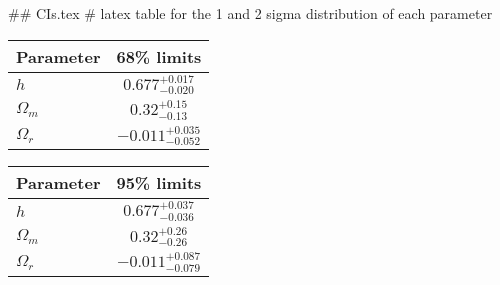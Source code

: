 ## CIs.tex
# latex table for the 1 and 2 sigma distribution of each parameter

\begin{tabular} { l  c}
 Parameter &  68\% limits\\
\hline
{\boldmath$h              $} & $0.677^{+0.017}_{-0.020}   $\\
{\boldmath$\Omega_m       $} & $0.32^{+0.15}_{-0.13}      $\\
{\boldmath$\Omega_r       $} & $-0.011^{+0.035}_{-0.052}  $\\
\hline
\end{tabular}

\begin{tabular} { l  c}
 Parameter &  95\% limits\\
\hline
{\boldmath$h              $} & $0.677^{+0.037}_{-0.036}   $\\
{\boldmath$\Omega_m       $} & $0.32^{+0.26}_{-0.26}      $\\
{\boldmath$\Omega_r       $} & $-0.011^{+0.087}_{-0.079}  $\\
\hline
\end{tabular}
